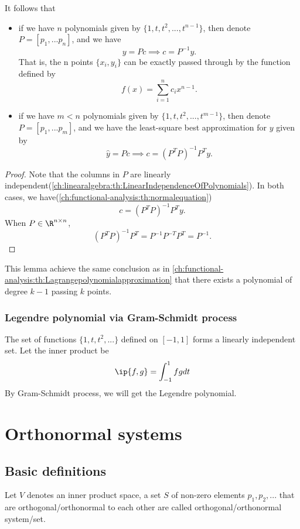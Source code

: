 \begin{refsection}
\begin{lemma}
It follows that
\begin{itemize}
	\item if we have $n$ polynomials given by $\{1,t,t^2,...,t^{n-1}\}$, then denote
	$P=[p_1,...p_n]$, and we have 
	$$y=Pc \implies c = P^{-1}y.$$
	That is, the n points $\{x_i,y_i\}$ can be exactly passed through by the function defined by
	$$f(x) = \sum_{i=1}^{n} c_i x^{n-1}.$$
	\item if we have $m<n$ polynomials given by  $\{1,t,t^2,...,t^{m-1}\}$, then denote
	$P=[p_1,...p_m]$, and we have the least-square best approximation for $y$ given by
	$$\hat{y}=Pc \implies c = (P^TP)^{-1}P^Ty.$$
\end{itemize}
\end{lemma}
\begin{proof}
Note that the columns in $P$ are linearly independent(\autoref{ch:linearalgebra:th:LinearIndependenceOfPolynomials}). In both cases, we have(\autoref{ch:functional-analysis:th:normalequation})
$$c = (P^TP)^{-1}P^Ty.$$
When $P\in \R^{n\times n}$, $$(P^TP)^{-1}P^T = P^{-1}P^{-T}P^T = P^{-1}.$$
\end{proof}


\begin{remark}
This lemma achieve the same conclusion as in \autoref{ch:functional-analysis:th:Lagrangepolynomialapproximation} that there exists a polynomial of degree $k-1$ passing $k$ points.	
\end{remark}

\subsubsection{Legendre polynomial via Gram-Schmidt process}
The set of functions $\{1,t,t^2,...\}$ defined on $[-1,1]$ forms a linearly independent set. Let the inner product be $$\ip{f,g}=\int_{-1}^1 f g dt$$
By Gram-Schmidt process, we will get the Legendre polynomial.




\section{Orthonormal systems}

\subsection{Basic definitions}
\begin{definition}
	\cite[101]{debnath2005hilbert}
	Let $V$ denotes an inner product space, a set $S$ of non-zero elements $p_1,p_2,...$ that are orthogonal/orthonormal to each other are called orthogonal/orthonormal system/set.
\end{definition}


\end{refsection}
